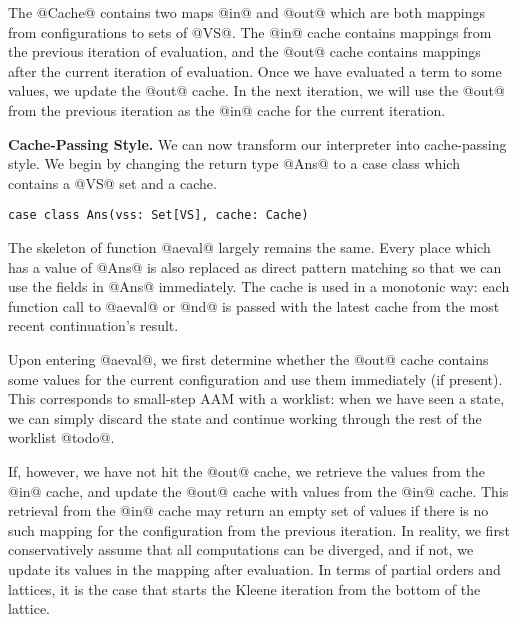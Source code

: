 \documentclass[acmsmall,review,anonymous]{acmart}\settopmatter{printfolios=true,printccs=false,printacmref=false}
\begin{document}
The @Cache@ contains two maps @in@ and @out@ which are both mappings from
configurations to sets of @VS@. The @in@ cache contains mappings from the
previous iteration of evaluation, and the @out@ cache contains mappings after the current
iteration of evaluation. Once we have evaluated a term to some values,
we update the @out@ cache. In the next iteration, we will use the @out@
from the previous iteration as the @in@ cache for the current iteration.

\textbf{Cache-Passing Style.}
We can now transform our interpreter into cache-passing style.
We begin by changing the return type @Ans@ to a case class which contains a @VS@ set and
a cache.

\begin{lstlisting}
case class Ans(vss: Set[VS], cache: Cache)
\end{lstlisting}

The skeleton of function @aeval@ largely remains the same.
Every place which has a value of @Ans@ is also replaced as direct pattern matching so
that we can use the fields in @Ans@ immediately.
The cache is used in a monotonic way: each function call to @aeval@ or @nd@ is
passed with the latest cache from the most recent continuation's result.

Upon entering @aeval@, we first determine whether the @out@ cache
contains some values for the current configuration and use them immediately (if present).
This corresponds to small-step AAM with a worklist: when we have seen a state,
we can simply discard the state and continue working through the rest of the worklist @todo@.

If, however, we have not hit the @out@ cache, we retrieve the values from the @in@ cache, and update the @out@ cache
with values from the @in@ cache. This retrieval from the @in@ cache may return an empty set of values if there is no such mapping for the configuration from the previous iteration.
In reality, we first conservatively assume that all computations can be diverged, and
if not, we update its values in the mapping after evaluation.
In terms of partial orders and lattices, it is the case that starts
the Kleene iteration from the bottom of the lattice.
\end{document}
